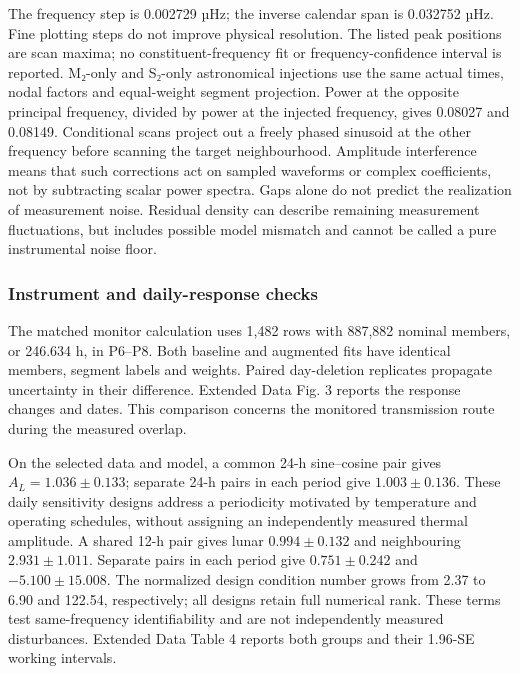 \documentclass[
  12pt,
  a4paper,
]{article}
\begin{document}
The frequency step is 0.002729 µHz; the inverse calendar span is
0.032752 µHz. Fine plotting steps do not improve physical resolution.
The listed peak positions are scan maxima; no constituent-frequency fit
or frequency-confidence interval is reported. M₂-only and S₂-only
astronomical injections use the same actual times, nodal factors and
equal-weight segment projection. Power at the opposite principal
frequency, divided by power at the injected frequency, gives 0.08027 and
0.08149. Conditional scans project out a freely phased sinusoid at the
other frequency before scanning the target neighbourhood. Amplitude
interference means that such corrections act on sampled waveforms or
complex coefficients, not by subtracting scalar power spectra. Gaps
alone do not predict the realization of measurement noise. Residual
density can describe remaining measurement fluctuations, but includes
possible model mismatch and cannot be called a pure instrumental noise
floor.

\hypertarget{instrument-and-daily-response-checks}{%
\subsubsection{Instrument and daily-response
checks}\label{instrument-and-daily-response-checks}}

The matched monitor calculation uses 1,482 rows with 887,882 nominal
members, or 246.634 h, in P6--P8. Both baseline and augmented fits have
identical members, segment labels and weights. Paired day-deletion
replicates propagate uncertainty in their difference. Extended Data Fig.
3 reports the response changes and dates. This comparison concerns the
monitored transmission route during the measured overlap.

On the selected data and model, a common 24-h sine--cosine pair gives
\(A_L=1.036\pm0.133\); separate 24-h pairs in each period give
\(1.003\pm0.136\). These daily sensitivity designs address a periodicity
motivated by temperature and operating schedules, without assigning an
independently measured thermal amplitude. A shared 12-h pair gives lunar
\(0.994\pm0.132\) and neighbouring \(2.931\pm1.011\). Separate pairs in
each period give \(0.751\pm0.242\) and \(-5.100\pm15.008\). The
normalized design condition number grows from 2.37 to 6.90 and 122.54,
respectively; all designs retain full numerical rank. These terms test
same-frequency identifiability and are not independently measured
disturbances. Extended Data Table 4 reports both groups and their
1.96-SE working intervals.
\end{document}
